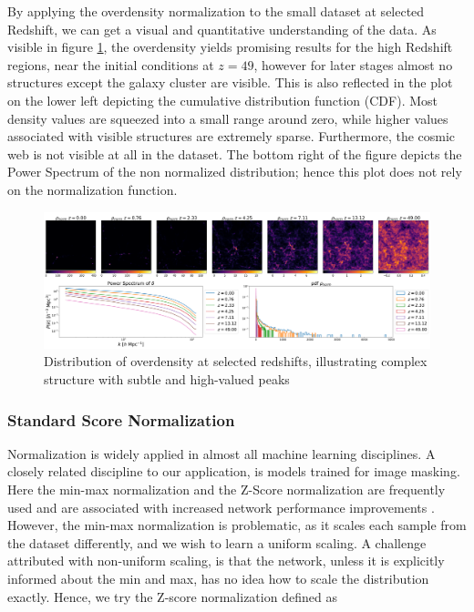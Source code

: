 \documentclass{article}
\begin{document}
By applying the overdensity normalization to the small dataset at selected Redshift, we can get a visual and quantitative understanding of the data. As visible in figure \ref{fig:ditr_delta}, the overdensity yields promising results for the high Redshift regions, near the initial conditions at $z=49$, however for later stages almost no structures except the galaxy cluster are visible. This is also reflected in the plot on the lower left depicting the cumulative distribution function (CDF). Most density values are squeezed into a small range around zero, while higher values associated with visible structures are extremely sparse. Furthermore, the cosmic web is not visible at all in the dataset. The bottom right of the figure depicts the Power Spectrum of the non normalized distribution; hence this plot does not rely on the normalization function.

\begin{figure}[h]
    \centering
    \includegraphics[width=1\linewidth]{img/delta.png}
    \caption{Distribution of overdensity at selected redshifts, illustrating complex structure with subtle and high-valued peaks}
    \label{fig:ditr_delta}
\end{figure}

\subsubsection{Standard Score Normalization}

Normalization is widely applied in almost all machine learning disciplines. A closely related discipline to our application, is models trained for image masking. Here the min-max normalization and the Z-Score normalization are frequently used and are associated with increased network performance improvements \citep{patro2015normalization}. However, the min-max normalization is problematic, as it scales each sample from the dataset differently, and we wish to learn a uniform scaling. A challenge attributed with non-uniform scaling, is that the network, unless it is explicitly informed about the min and max, has no idea how to scale the distribution exactly. Hence, we try the Z-score normalization defined as 
\end{document}
